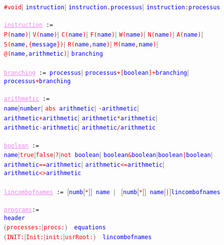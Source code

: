 \documentclass[article,11pt]{amsbook}
\def\wrn#1{\textcolor{red}{#1}}
\def\hil#1{\textcolor{blue}{#1}}
\def\voh#1{\textcolor{violet}{#1}}
\def\name{{\hil{\texttt{\scriptsize name}}}}
\def\numb{{\hil{\texttt{\scriptsize number}}}}
\def\arith{\hil{\texttt{arithmetic}}}
\def\ruledef#1{\voh{\underline{\texttt{#1}}}}
\def\rulecall#1{\hil{{\texttt{#1}}}}
\def\kw#1{\wrn{\texttt{#1}}}
\def\definer{\texttt{ := }}
\begin{document}
{\kw{\#void}{$\big|$}
\rulecall{instruction}{$\big|$}
\rulecall{instruction}\kw{.}\rulecall{processus}{$\big|$}
\rulecall{instruction}\kw{:}\rulecall{processus}
\\ \ \\
\ruledef{instruction}\definer\\
\kw{P(}\name\kw{)}{$\big|$}
\kw{V(}\name\kw{)}{$\big|$}
\kw{C(}\name\kw{)}{$\big|$}
\kw{F(}\name\kw{)}{$\big|$}
\kw{W(}\name\kw{)}{$\big|$}
\kw{N(}\name\kw{)}{$\big|$}
\kw{A(}\name\kw{)}{$\big|$}\\
\kw{S(}\name\kw{,\{}\hil{{\texttt{message}}}\kw{\})}{$\big|$}
\kw{R(}\name\kw{,}\name\kw{)}{$\big|$}
\kw{M(}\name\kw{,}\name\kw{)}{$\big|$}\\
\kw{@(}\name\kw{,}\hil{{\texttt{arithmetic}}}\kw{)}{$\big|$}
\rulecall{branching}
\\ \ \\
\ruledef{branching}\definer\rulecall{processus}{$\big|$}
\rulecall{processus}\kw{+[}\rulecall{boolean}\kw{]+}\rulecall{branching}{$\big|$}
\rulecall{processus}\kw{+}\rulecall{branching}
\\ \ \\
\ruledef{arithmetic}\definer\\
\name{$\big|$}\numb{$\big|$}
\kw{abs }\arith{$\big|$}
\kw{-}\arith{$\big|$}\\
\arith\kw{+}\arith{$\big|$}
\arith\kw{*}\arith{$\big|$}\\
\arith\kw{-}\arith{$\big|$}
\arith\kw{/}\arith
\\\ \\
\ruledef{boolean}\definer\\
\rulecall{name}{$\big|$}\kw{true}{$\big|$}\kw{false}{$\big|$}\kw{?}{$\big|$}\kw{not
}\hil{\texttt{{boolean}}}{$\big|$}
\hil{\texttt{{boolean}}}\kw{\&}\hil{\texttt{{boolean}}}{$\big|$}\hil{\texttt{{boolean}}}\kw{|}\hil{\texttt{{boolean}}}{$\big|$}\\
\arith\kw{==}\arith{$\big|$}
\arith\kw{<=}\arith{$\big|$}\\
\arith\kw{<>}\arith
\\\ \\
\ruledef{lincombofnames}\definer$[$\rulecall{numb}$[$\kw{*}$]]$\texttt{ }\rulecall{name}\texttt{ }{$\big|$}\texttt{ }
$[$\rulecall{numb}$[$\kw{*}$]]$\texttt{ }\rulecall{name}$[$\kw{|}$]$\rulecall{lincombofnames}\\ \ \\
%
\ruledef{programs}\texttt{:=}\\
\rulecall{header}\\
$\big($\kw{processes:}$\big|$\kw{procs:}$\big)$\ \ \rulecall{equations}\\
$\big($\kw{INIT:}$\big|$\kw{Init:}$\big|$\kw{init:}$\big|$\kw{usrRoot:}$\big)$\
\ \rulecall{lincombofnames}
}
\end{document}
